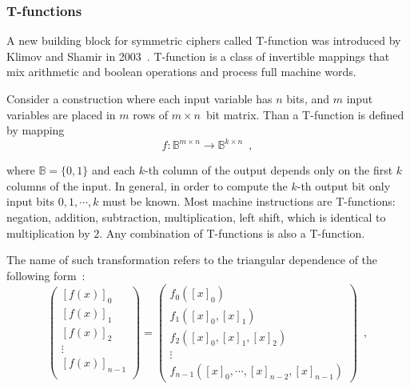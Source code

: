 \subsubsection{T-functions}

A new building block for symmetric ciphers called T-function was introduced by
Klimov and Shamir in 2003~\cite{klimov:tfunc}. T-function is a class of
invertible mappings that mix arithmetic and boolean operations and process
full machine words.

Consider a construction where each input variable has $n$ bits, and $m$ input
variables are placed in $m$ rows of \mbox{$m \times n$ bit} matrix. Than a
T-function is defined by mapping
\begin{equation}
    \label{eqn:t-func}
    f: \mathbb{B}^{m \times n} \rightarrow \mathbb{B}^{k \times n} \enspace,
\end{equation}%

where $\mathbb{B} = \{0, 1\}$ and each $k$-th column of the output depends only on
the first $k$ columns of the input. In general, in order to compute the $k$-th
output bit only input bits $0, 1, \cdots, k$ must be known. Most machine
instructions are T-functions: negation, addition, subtraction, multiplication, left
shift, which is identical to multiplication by $2$. Any combination of
T-functions is also a T-function.

The name of such transformation refers to the triangular dependence of the following
form~\cite{dblp:conf/fse/klimovs05}:
\begin{equation}
    \left(
    \begin{array}{c}
        \left[ f(x) \right]_0 \\
        \left[ f(x) \right]_1 \\
        \left[ f(x) \right]_2 \\
        \vdots \\
        \left[ f(x) \right]_{n-1} \\
    \end{array} \right)%
    = \left(
    \begin{array}{c}
        f_0([x]_0) \\
        f_1([x]_0, [x]_1) \\
        f_2([x]_0, [x]_1, [x]_2) \\
        \vdots \\
        f_{n-1}([x]_0, \cdots, [x]_{n-2}, [x]_{n-1})
    \end{array} \right) \enspace, 
\end{equation}

